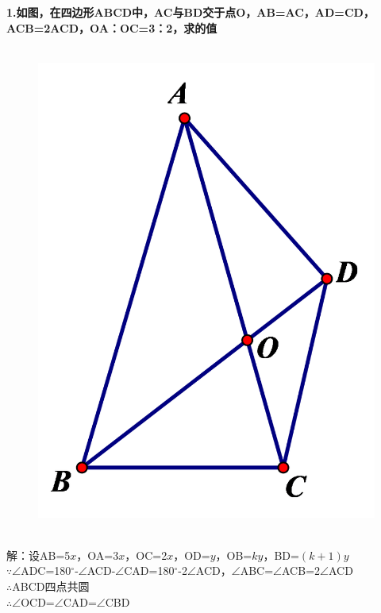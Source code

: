 \documentclass{article}
\begin{document}
 
    \noindent \large \textbf{1.如图，在四边形ABCD中，AC与BD交于点O，AB=AC，AD=CD，\bm{$\angle $}ACB=2\bm{$\angle $}ACD，OA：OC=3：2，求的值}\\\\
    \begin{figure}[ht]
        \centering
        \includegraphics[scale=0.2]{1.png}
    \end{figure}\\
    解：设AB=5$x$，OA=3$x$，OC=2$x$，OD=$y$，OB=$ky$，BD=$(k+1)y$\\
    $\because $\quad $\angle $ADC=180$^{\circ }$-$\angle $ACD-$\angle $CAD=180$^{\circ}$-2$\angle $ACD，$\angle $ABC=$\angle $ACB=2$\angle $ACD \\
    $\therefore $\quad ABCD四点共圆 \\
    $\therefore $\quad $\angle $OCD=$\angle $CAD=$\angle $CBD \\
\end{document}

